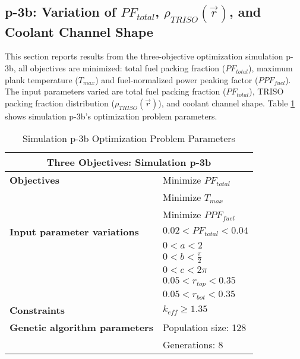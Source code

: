 \subsection{p-3b: Variation of $PF_{total}$, $\rho_{TRISO}(\vec{r})$, and Coolant 
Channel Shape}
This section reports results from the three-objective optimization simulation p-3b, 
all objectives are minimized: total fuel packing fraction ($PF_{total}$), maximum plank 
temperature ($T_{max}$) and fuel-normalized power peaking factor ($PPF_{fuel}$).  
The input parameters varied are total fuel packing fraction ($PF_{total}$), 
TRISO packing fraction distribution ($\rho_{TRISO}(\vec{r})$), and coolant channel 
shape.  
Table \ref{tab:simulationp3b} shows simulation p-3b's optimization problem parameters. 
\begin{table}[htbp!]
    \centering
    \onehalfspacing
    \caption{Simulation p-3b Optimization Problem Parameters}
	\label{tab:simulationp3b}
    \footnotesize
    \begin{tabular}{l|p{4cm}}
    \hline 
    \multicolumn{2}{c}{\textbf{Three Objectives: Simulation p-3b}} \\
    \hline 
    \textbf{Objectives} & Minimize $PF_{total}$ \\
    & Minimize $T_{max}$ \\
    & Minimize $PPF_{fuel}$ \\
    \hline 
    \textbf{Input parameter variations} & $0.02<PF_{total}<0.04$ \\
    & $0<a<2$ \\
    & $0<b<\frac{\pi}{2}$ \\
    & $0<c<2\pi$ \\
    & $0.05<r_{top}<0.35$ \\
    & $0.05<r_{bot}<0.35$ \\
    \hline
    \textbf{Constraints} & $k_{eff} \geq 1.35$\\ 
    \hline 
    \textbf{Genetic algorithm parameters} & Population size: 128 \\
    & Generations: 8 \\
    \hline
    \end{tabular}
\end{table}

